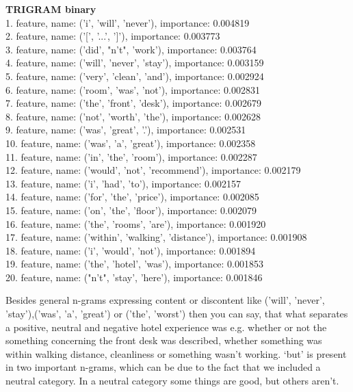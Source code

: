 \documentclass{article}
\begin{document}
\textbf{TRIGRAM binary}\\
1. feature, name: ('i', 'will', 'never'), importance: 0.004819\\
2. feature, name: ('[', '...', ']'), importance: 0.003773\\
3. feature, name: ('did', "n't", 'work'), importance: 0.003764\\
4. feature, name: ('will', 'never', 'stay'), importance: 0.003159\\
5. feature, name: ('very', 'clean', 'and'), importance: 0.002924\\
6. feature, name: ('room', 'was', 'not'), importance: 0.002831\\
7. feature, name: ('the', 'front', 'desk'), importance: 0.002679\\
8. feature, name: ('not', 'worth', 'the'), importance: 0.002628\\
9. feature, name: ('was', 'great', '.'), importance: 0.002531\\
10. feature, name: ('was', 'a', 'great'), importance: 0.002358\\
11. feature, name: ('in', 'the', 'room'), importance: 0.002287\\
12. feature, name: ('would', 'not', 'recommend'), importance: 0.002179\\
13. feature, name: ('i', 'had', 'to'), importance: 0.002157\\
14. feature, name: ('for', 'the', 'price'), importance: 0.002085\\
15. feature, name: ('on', 'the', 'floor'), importance: 0.002079\\
16. feature, name: ('the', 'rooms', 'are'), importance: 0.001920\\
17. feature, name: ('within', 'walking', 'distance'), importance: 0.001908\\
18. feature, name: ('i', 'would', 'not'), importance: 0.001894\\
19. feature, name: ('the', 'hotel', 'was'), importance: 0.001853\\
20. feature, name: ("n't", 'stay', 'here'), importance: 0.001846 \\
\newpage

Besides general n-grams expressing content or discontent like ('will', 'never', 'stay'),('was', 'a', 'great') or ('the', 'worst') then you can say, that what separates a positive, neutral and negative hotel experience was e.g. whether or not the something concerning the front desk was described, whether something was within walking distance, cleanliness or something wasn’t working. ‘but’ is present in two important n-grams, which can be due to the fact that we included a neutral category. In a neutral category some things are good, but others aren’t. 
\end{document}
